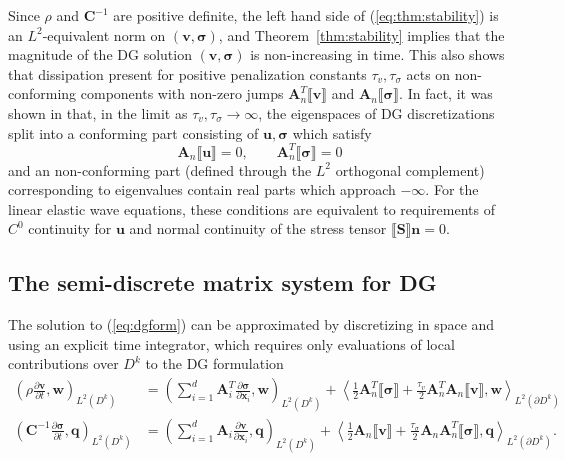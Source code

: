 \documentclass{siamart0216}
\newcommand{\pd}[2]{\frac{\partial#1}{\partial#2}}
\newcommand{\LRp}[1]{\left( #1 \right)}
\newcommand{\LRa}[1]{\left\langle #1 \right\rangle}
\newcommand{\jump}[1] {\ensuremath{\llbracket#1\rrbracket}}
\newcommand{\Lk}{L^2\LRp{D^k}}
\newcommand{\Ldk}{L^2\LRp{\partial D^k}}
\begin{document}
Since $\rho$ and $\bm{C}^{-1}$ are positive definite, the left hand side of (\ref{eq:thm:stability}) is an $L^2$-equivalent norm on $(\bm{v},\bm{\sigma})$, and Theorem~\ref{thm:stability} implies that the magnitude of the DG solution $(\bm{v},\bm{\sigma})$ is non-increasing in time.  This also shows that dissipation present for positive penalization constants $\tau_v,\tau_{\sigma}$ acts on non-conforming components with non-zero jumps $\bm{A}_n^T\jump{\bm{v}}$ and $\bm{A}_n\jump{\bm{\sigma}}$.  In fact, it was shown in \cite{chan2016short} that, in the limit as $\tau_v,\tau_\sigma \rightarrow\infty$, the eigenspaces of DG discretizations split into a conforming part consisting of $\bm{u},\bm{\sigma}$ which satisfy
\[
\bm{A}_n\jump{\bm{u}} = 0, \qquad \bm{A}_n^T\jump{\bm{\sigma}} = 0
\]
and an non-conforming part (defined through the $L^2$ orthogonal complement) corresponding to eigenvalues contain real parts which approach $-\infty$.  For the linear elastic wave equations, these conditions are equivalent to requirements of $C^0$ continuity for $\bm{u}$ and normal continuity of the stress tensor $\jump{\bm{S}}\bm{n} = 0$.

\subsection{The semi-discrete matrix system for DG}

The solution to (\ref{eq:dgform}) can be approximated by discretizing in space and using an explicit time integrator, which requires only evaluations of local contributions over $D^k$ to the DG formulation
\begin{align}
\LRp{\rho \pd{\bm{v}}{t},\bm{w}}_{\Lk} &= {\LRp{ \sum_{i=1}^d \bm{A}_i^T\pd{\bm{\sigma}}{\bm{x}_i},\bm{w}}_{\Lk}  + \LRa{\frac{1}{2}\bm{A}_n^T\jump{\bm{\sigma}} + \frac{\tau_v}{2}\bm{A}_n^T\bm{A}_n\jump{\bm{v}},\bm{w}}_{\Ldk}} \nonumber\\
\LRp{\bm{C}^{-1} \pd{\bm{\sigma}}{t},\bm{q}}_{\Lk} &= {\LRp{\sum_{i=1}^d \bm{A}_i \pd{\bm{v}}{\bm{x}_i},\bm{q}}_{\Lk} + \LRa{\frac{1}{2}\bm{A}_n\jump{\bm{v}} + \frac{\tau_{\sigma}}{2}\bm{A}_n\bm{A}_n^T\jump{\bm{\sigma}},\bm{q}}_{\Ldk}}. 
\label{eq:dgloc} 
\end{align}
\end{document}
